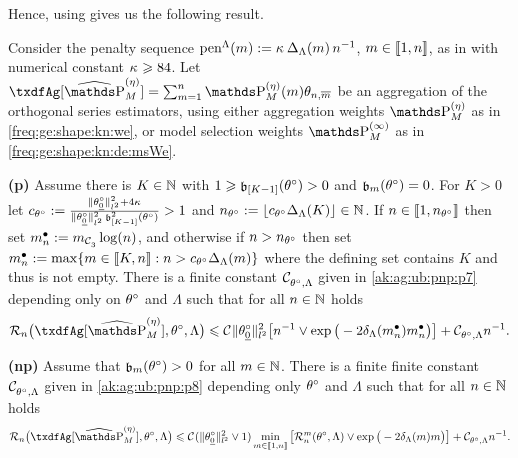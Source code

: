 Hence, using  gives us the following result.
\begin{thm}
Consider the penalty sequence $\penSv:=\penD$, $\Di\in\nset{1,n}$, as in  with numerical constant $\cpen \geq 84$.
Let $\txdfAg[{\erWe[]}]=\sum_{\Di=1}^{\ssY}\We\txdfPr$ be an aggregation of the orthogonal series estimators, using either aggregation weights $\rWe[]$ as in \eqref{freq:ge:shape:kn:we}, or model selection weights $\msWe[]$ as in \eqref{freq:ge:shape:kn:de:msWe}.
\begin{Liste}[]
\item[{\dgrau\bfseries{(p)}}]Assume there is $K\in\Nz$
  with   $1\geq \bias[{[K-1] }](\xdf)>0$ and $\bias[\Di](\xdf)=0$. For
  $K>0$ let
  $ c_{\xdf}:=\tfrac{\Vnormlp{\xdf_{\underline{0}}}^2+4\cpen}{\Vnormlp{\xdf_{\underline{0}}}^2\bias[{[K-1]}]^2(\xdf)}>1$ and
  $\ssY_{\xdf}:=\gauss{c_{\xdf}\DipenSv[K]}\in\Nz$. If
  $\ssY\in\nset{1,\ssY_{\xdf}}$ then set $\sDi{\ssY}:=\Di_{\cst{3}}\log(\ssY)$, and otherwise if
  $\ssY>\ssY_{\xdf}$ then set
  $\sDi{\ssY}:=\max\{\Di\in\nset{K,\ssY}:\ssY>c_{\xdf}\DipenSv\}$
  where the defining set contains $K$ and thus is not empty.
There is a finite constant $\cst{\xdf,\Lambda}$
given in \eqref{ak:ag:ub:pnp:p7} depending only on $\xdf$ and $\Lambda$ such that for all $n\in\Nz$ holds
\begin{equation}
  \nRi{\txdfAg[{\erWe[]}]}{\xdf,\Lambda}
  \leq
  \cst{}\Vnormlp{\xdf_{\underline{0}}}^2\big[
  \ssY^{-1}\vee\exp\big(-2\cmiSv[\sDi{\ssY}]\sDi{\ssY}\big)\big]
  + \cst{\xdf,\Lambda}\ssY^{-1}.
\end{equation}
\item[{\dgrau\bfseries{(np)}}] Assume that
  $\bias(\xdf)>0$ for all  $\Di\in\Nz$.
There is a finite finite constant $\cst{\xdf,\Lambda}$ given in
\eqref{ak:ag:ub:pnp:p8} depending only $\xdf$ and $\Lambda$ such that for all
$\ssY\in\Nz$  holds 
 \begin{equation}
   \nRi{\txdfAg[{\erWe[]}]}{\xdf,\Lambda}
    \leq 
   \cst{}(\Vnormlp{\xdf_{\underline{0}}}^2\vee1)\min_{\Di\in\nset{1,\ssY}}\big[\dRa{\Di}{\xdf,\Lambda}\vee\exp\big(-2\cmiSv\Di\big)\big]\\
   +\cst{\xdf,\Lambda}\ssY^{-1}.
\end{equation}
\end{Liste} 
\reEnd 
\end{thm}

